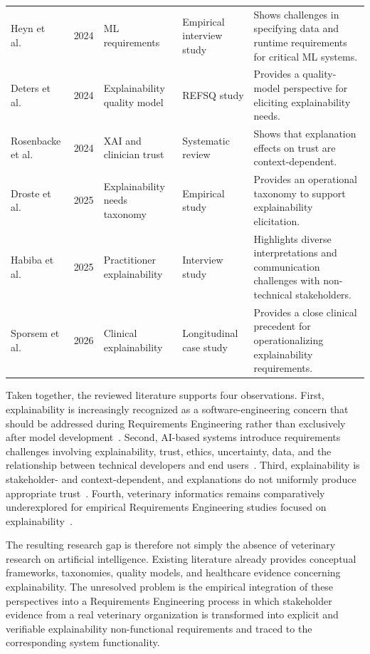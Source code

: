 \documentclass[pdflatex,sn-mathphys-num,Numbered]{sn-jnl}
\begin{document}
\begin{table}[tp]
\begin{tabular}{@{}p{2.4cm}p{0.7cm}p{2.0cm}p{2.0cm}p{3.2cm}@{}}
Heyn et al.~\cite{heyn2024} & 2024 & ML requirements & Empirical interview study & Shows challenges in specifying data and runtime requirements for critical ML systems. \\
Deters et al.~\cite{deters2024} & 2024 & Explainability quality model & REFSQ study & Provides a quality-model perspective for eliciting explainability needs. \\
Rosenbacke et al.~\cite{rosenbacke2024} & 2024 & XAI and clinician trust & Systematic review & Shows that explanation effects on trust are context-dependent. \\
Droste et al.~\cite{droste2025} & 2025 & Explainability needs taxonomy & Empirical study & Provides an operational taxonomy to support explainability elicitation. \\
Habiba et al.~\cite{habiba2025} & 2025 & Practitioner explainability & Interview study & Highlights diverse interpretations and communication challenges with non-technical stakeholders. \\
Sporsem et al.~\cite{sporsem2026} & 2026 & Clinical explainability & Longitudinal case study & Provides a close clinical precedent for operationalizing explainability requirements. \\
\bottomrule
\end{tabular}
\end{table}

Taken together, the reviewed literature supports four observations. First, explainability is increasingly recognized as a software-engineering concern that should be addressed during Requirements Engineering rather than exclusively after model development~\cite{chazette2020,chazette2021,chazette2022,deters2024,droste2025}. Second, AI-based systems introduce requirements challenges involving explainability, trust, ethics, uncertainty, data, and the relationship between technical developers and end users~\cite{ahmad2023,habiba2024,habibullah2023,heyn2024}. Third, explainability is stakeholder- and context-dependent, and explanations do not uniformly produce appropriate trust~\cite{debritoduarte2023,freyer2024,rosenbacke2024,habiba2025}. Fourth, veterinary informatics remains comparatively underexplored for empirical Requirements Engineering studies focused on explainability~\cite{lustgarten2020}.

The resulting research gap is therefore not simply the absence of veterinary research on artificial intelligence. Existing literature already provides conceptual frameworks, taxonomies, quality models, and healthcare evidence concerning explainability. The unresolved problem is the empirical integration of these perspectives into a Requirements Engineering process in which stakeholder evidence from a real veterinary organization is transformed into explicit and verifiable explainability non-functional requirements and traced to the corresponding system functionality.
\end{document}
